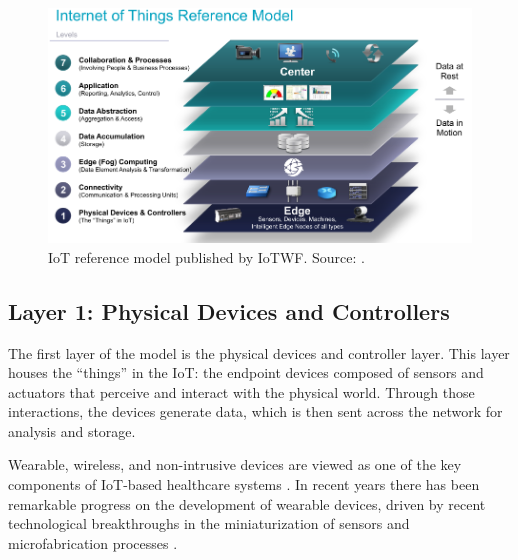 \begin{figure}[H]
    \centering
    \includegraphics[width=0.85\linewidth]{images/iotwf-referencemodel.png}
    \caption[IoT reference model published by IoTWF.]{IoT reference model published by IoTWF. Source: \cite{Cisco2014}.}
    \label{fig:iotwf-referencemodel}
\end{figure}

\subsection{Layer 1: Physical Devices and Controllers}
\label{sec:iot-model-layer1}


The first layer of the model is the physical devices and controller layer. This layer houses the ``things'' in the \acl{IoT}: the endpoint devices composed of sensors and actuators that perceive and interact with the physical world. Through those interactions, the devices generate data, which is then sent across the network for analysis and storage. \bigskip



Wearable, wireless, and non-intrusive devices are viewed as one of the key components of \acs{IoT}-based healthcare systems \cite{Baker2017}. In recent years there has been remarkable progress on the development of wearable devices, driven by recent technological breakthroughs in the miniaturization of sensors and microfabrication processes \cite{Adame2018, Catarinucci2015}.


